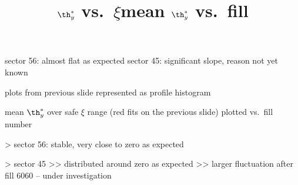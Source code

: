 \> sector 56: almost flat as expected
\> sector 45: significant slope, reason not yet known

\newpage %
\title{$\th^*_y$ vs.~$\xi$}

\> plots from previous slide represented as profile histogram

\centerline{}


\newpage %
\title{mean $\th^*_y$ vs.~fill}

\> mean $\th^*_y$ over safe $\xi$ range (red fits on the previous slide) plotted vs.~fill number

\centerline{}

\>> sector 56: stable, very close to zero as expected

\>> sector 45
\>>> distributed around zero as expected
\>>> larger fluctuation after fill 6060 -- under investigation

\vfil
\eject
\bye
